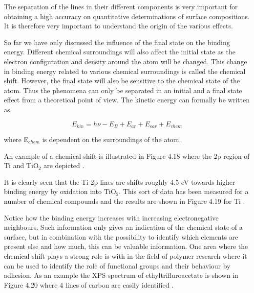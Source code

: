              The separation of the lines in their different
          components is very important for obtaining a high accuracy
          on quantitative determinations of surface compositions. It is
          therefore very important to understand the origin of the
          various effects.

             So far  we have only discussed the influence of the
          final state on the binding energy. Different chemical
          surroundings will also affect the initial state as the
          electron configuration and density around the atom will be
          changed. This change in binding energy related to various
          chemical surroundings is called the chemical shift. However,
          the final state will also be sensitive to the chemical
          state of the atom. Thus the phenomena can only be separated
          in an initial and a final state effect from a theoretical
          point of view. The kinetic energy can formally be written as

\begin{equation}
E_{kin}=h\nu-E_{B}+E_{ar} +E_{ear}+E_{chem}
\end{equation}

             where E$_{chem}$ is dependent on the
          surroundings of the atom.

          An example of a chemical shift is illustrated in Figure 4.18
          where the 2p region of Ti and TiO$_{2}$ are depicted \cite{perkin}.


             It is clearly seen that the Ti 2p lines are shifts
          roughly 4.5 eV towards higher binding energy by oxidation
          into TiO$_{2}$. This sort of data has been measured for a
          number of chemical compounds and the results are shown in
          Figure 4.19 for Ti \cite{perkin}.


             Notice how the binding energy increases with increasing
          electronegative neighbours. Such information  only gives
          an indication of the chemical state of a surface, but in
          combination with the possibility to identify which elements
          are present else and how much, this can be  valuable
          information. One area where the chemical shift plays a
          strong role is with in the field of polymer research where
          it can be used to identify the role of functional groups and
          their behaviour by adhesion. As an example  the XPS
          spectrum of ethyltrifluroacetate is shown in Figure 4.20 where
          4 lines of carbon are easily  identified \cite{ghosh}.

